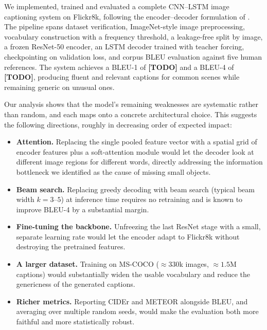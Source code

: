 \documentclass{article}
\begin{document}
We implemented, trained and evaluated a complete CNN--LSTM image captioning
system on Flickr8k, following the encoder--decoder formulation of
\citet{vinyals2015show}. The pipeline spans dataset verification, ImageNet-style
image preprocessing, vocabulary construction with a frequency threshold, a
leakage-free split by image, a frozen ResNet-50 encoder, an LSTM decoder trained
with teacher forcing, checkpointing on validation loss, and corpus BLEU
evaluation against five human references. The system achieves a BLEU-1 of
\textbf{[TODO]} and a BLEU-4 of \textbf{[TODO]}, producing fluent and relevant
captions for common scenes while remaining generic on unusual ones.

Our analysis shows that the model's remaining weaknesses are systematic rather
than random, and each maps onto a concrete architectural choice. This suggests
the following directions, roughly in decreasing order of expected impact:

\begin{itemize}
  \item \textbf{Attention.} Replacing the single pooled feature vector with a
        spatial grid of encoder features plus a soft-attention module
        \citep{xu2015show} would let the decoder look at different image regions
        for different words, directly addressing the information bottleneck we
        identified as the cause of missing small objects.
  \item \textbf{Beam search.} Replacing greedy decoding with beam search
        (typical beam width $k = 3$--$5$) at inference time requires no
        retraining and is known to improve BLEU-4 by a substantial margin.
  \item \textbf{Fine-tuning the backbone.} Unfreezing the last ResNet stage with
        a small, separate learning rate would let the encoder adapt to Flickr8k
        without destroying the pretrained features.
  \item \textbf{A larger dataset.} Training on MS-COCO
        \citep{lin2014microsoft} ($\approx 330$k images, $\approx 1.5$M captions)
        would substantially widen the usable vocabulary and reduce the genericness
        of the generated captions.
  \item \textbf{Richer metrics.} Reporting CIDEr \citep{vedantam2015cider} and
        METEOR alongside BLEU, and averaging over multiple random seeds, would
        make the evaluation both more faithful and more statistically robust.
\end{itemize}
\end{document}
